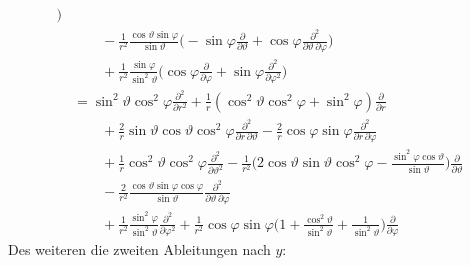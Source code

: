 \begin{align*}
\biggr)
\\
&\qquad
-\frac1{r^2}
\frac{ \cos\vartheta \sin\varphi }{\sin\vartheta}\biggl(
-\sin\varphi\frac{\partial}{\partial\vartheta}
+\cos\varphi\frac{\partial^2}{\partial\vartheta\,\partial\varphi}
\biggr)
\\
&\qquad
+\frac1{r^2}\frac{\sin\varphi}{\sin^2\vartheta}\biggl(
\cos\varphi\frac{\partial}{\partial\varphi}
+\sin\varphi\frac{\partial^2}{\partial\varphi^2}
\biggr)
\\
&=
\sin^2\vartheta\cos^2\varphi \frac{\partial^2}{\partial r^2}
+
\frac1r( \cos^2\vartheta\cos^2\varphi + \sin^2\varphi)
\frac{\partial}{\partial r}
\\
&\qquad
+
\frac{2}r\sin\vartheta\cos\vartheta\cos^2\varphi
\frac{\partial^2}{\partial r\,\partial\vartheta}
-
\frac2r\cos\varphi\sin\varphi
\frac{\partial^2}{\partial r\,\partial\varphi}
\\
&\qquad
+
\frac1r\cos^2\vartheta\cos^2\varphi \frac{\partial^2}{\partial \vartheta^2}
-
\frac1{r^2}\biggl(
2\cos\vartheta\sin\vartheta\cos^2\varphi
-\frac{\sin^2\varphi\cos\vartheta}{\sin\vartheta}
\biggr)
\frac{\partial}{\partial\vartheta}
\\
&\qquad
-
\frac2{r^2}\frac{ \cos\vartheta \sin\varphi \cos\varphi }{\sin\vartheta}
\frac{\partial^2}{\partial \vartheta\,\partial\varphi}
\\
&\qquad
+
\frac1{r^2}\frac{\sin^2\varphi}{\sin^2\vartheta}
\frac{\partial^2}{\partial \varphi^2}
+
\frac1{r^2}\cos\varphi\sin\varphi\biggl(
1+\frac{\cos^2\vartheta}{\sin^2\vartheta}
+
\frac1{\sin^2\vartheta}
\biggr)
\frac{\partial}{\partial\varphi}
\end{align*}
Des weiteren die zweiten Ableitungen nach $y$:
